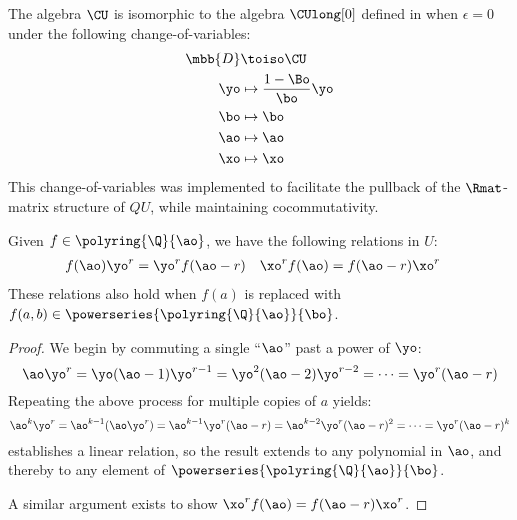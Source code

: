 \begin{remark}
        The algebra $\CU$ is isomorphic to the algebra $\CUlong[0]$ defined in
        \cite[§4]{BV23} when $ϵ=0$ under the following change-of-variables:
        \begin{equation}
                \begin{aligned}
                        \mbb{D} &\toiso \CU\\
                        \yo     &\mapsto \frac{1-\Bo}{\bo}\yo\\
                        \bo     &\mapsto \bo\\
                        \ao     &\mapsto \ao\\
                        \xo     &\mapsto \xo
                \end{aligned}
        \end{equation}
        This change-of-variables was implemented to facilitate the pullback of
        the $\Rmat$-matrix structure of $QU$, while maintaining cocommutativity.
\end{remark}

\begin{lemma}\label{lem:xay_relations}
        Given $f\in \polyring{\Q}{\ao}$, we have the
        following relations in $U$:
        \begin{align}\label{eq:xay_relations}
                f(\ao)\yo^r &= \yo^rf(\ao-r) &
                \xo^rf(\ao) &= f(\ao-r)\xo^r
        \end{align}
        These relations also hold when $f(a)$ is replaced with
        $f(a, b)\in \powerseries{\polyring{\Q}{\ao}}{\bo}$.
\end{lemma}
\begin{proof}
        We begin by commuting a single \enquote{$\ao$} past a power of $\yo$:
        \begin{equation}
                \ao \yo^r
                =\yo(\ao-1)\yo^{r-1}
                =\yo^2(\ao-2)\yo^{r-2}
                =\dots
                =\yo^{r}(\ao-r)
        \end{equation}
        Repeating the above process for multiple copies of $a$ yields:
        \begin{equation}\label{eq:ay_relation_monomial}
                \ao^k\yo^r
                =\ao^{k-1}(\ao \yo^r)
                =\ao^{k-1}\yo^r(\ao-r)
                =\ao^{k-2}\yo^r(\ao-r)^2
                =\dots
                =\yo^r(\ao-r)^k
        \end{equation}
         establishes a linear relation, so the
        result extends to any polynomial in $\ao$, and thereby to any element of
        $\powerseries{\polyring{\Q}{\ao}}{\bo}$.

        A similar argument exists to show $\xo^rf(\ao) = f(\ao-r)\xo^r$.
\end{proof}

